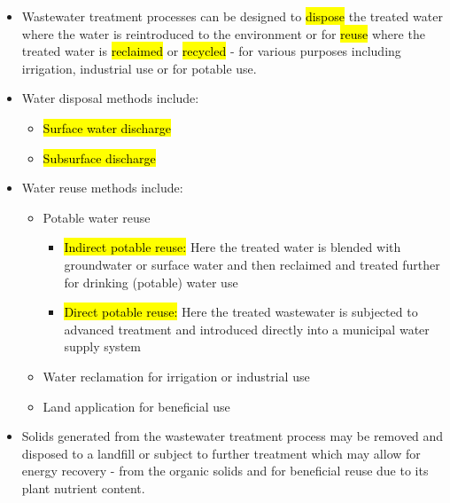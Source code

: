\begin{itemize}
\item Wastewater treatment processes can be designed to \hl{dispose} the treated water where the water is reintroduced to the environment or for \hl{reuse} where the treated water is \hl{reclaimed} or \hl{recycled} - for various purposes including irrigation, industrial use or for potable use.
\item Water disposal methods include:\\
\begin{itemize}
\item \hl{Surface water discharge}
\item \hl{Subsurface discharge}
\end{itemize}
\item Water reuse methods include:\\
\begin{itemize}
\item Potable water reuse
\begin{itemize}
\item \hl{Indirect potable reuse:}  Here the treated water is blended with groundwater or surface water and then reclaimed and treated further 
for drinking (potable) water use
\item \hl{Direct potable reuse:}  Here the treated wastewater is subjected to advanced treatment and introduced directly into a municipal water supply system
\end{itemize}
\item Water reclamation for irrigation or industrial use\\
\item Land application for beneficial use\\
\end{itemize}
\item Solids generated from the wastewater treatment process may be removed and disposed to a landfill or subject to further treatment which may allow for energy recovery - from the organic solids and for beneficial reuse due to its plant nutrient content.\\
\end{itemize}
%
%
%
%
